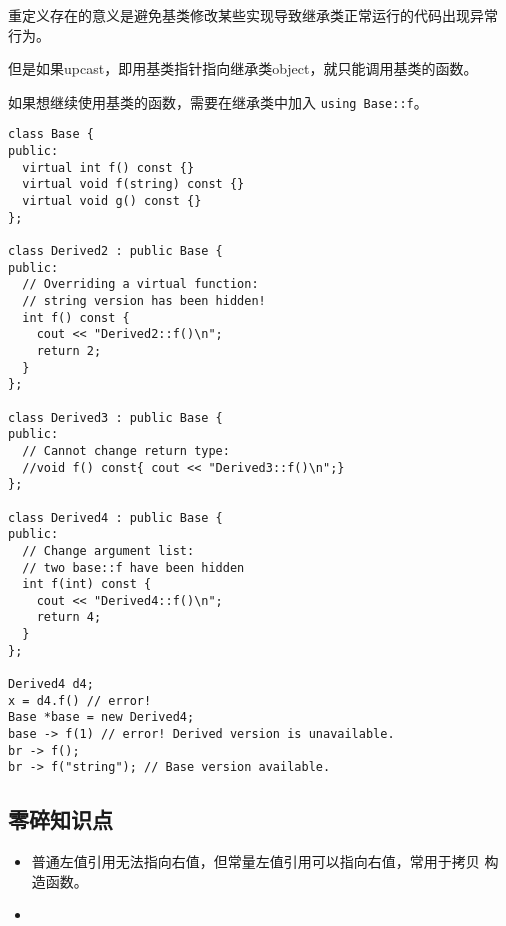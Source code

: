 重定义存在的意义是避免基类修改某些实现导致继承类正常运行的代码出现异常
行为。

但是如果upcast，即用基类指针指向继承类object，就只能调用基类的函数。

如果想继续使用基类的函数，需要在继承类中加入 \texttt{using Base::f}。
\begin{verbatim}
class Base {
public:
  virtual int f() const {}
  virtual void f(string) const {}
  virtual void g() const {}
};

class Derived2 : public Base {
public:
  // Overriding a virtual function:
  // string version has been hidden!
  int f() const {
    cout << "Derived2::f()\n";
    return 2;
  }
};

class Derived3 : public Base {
public:
  // Cannot change return type:
  //void f() const{ cout << "Derived3::f()\n";}
};

class Derived4 : public Base {
public:
  // Change argument list:
  // two base::f have been hidden
  int f(int) const {
    cout << "Derived4::f()\n";
    return 4;
  }
};

Derived4 d4;
x = d4.f() // error!
Base *base = new Derived4;
base -> f(1) // error! Derived version is unavailable.
br -> f();
br -> f("string"); // Base version available.
\end{verbatim}

\subsection{零碎知识点}

\begin{itemize}
\item 普通左值引用无法指向右值，但常量左值引用可以指向右值，常用于拷贝
  构造函数。
\item 
\end{itemize}
